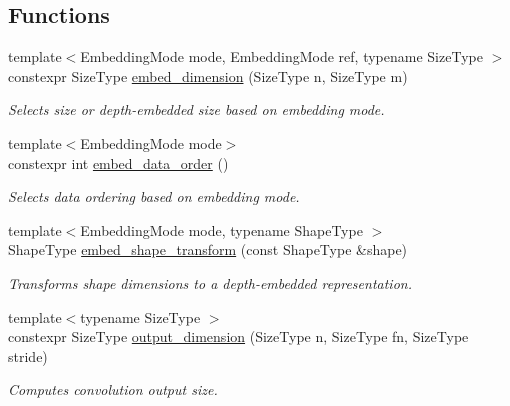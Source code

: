 \subsection*{Functions}
\begin{DoxyCompactItemize}
\item 
{\footnotesize template$<$Embedding\-Mode mode, Embedding\-Mode ref, typename Size\-Type $>$ }\\constexpr Size\-Type \hyperlink{namespaceffnn_1_1layer_1_1convolution_a0cca23056b3d9d79e6604c9419814351}{embed\-\_\-dimension} (Size\-Type n, Size\-Type m)
\begin{DoxyCompactList}\small\item\em Selects size or depth-\/embedded size based on embedding mode. \end{DoxyCompactList}\item 
{\footnotesize template$<$Embedding\-Mode mode$>$ }\\constexpr int \hyperlink{namespaceffnn_1_1layer_1_1convolution_a88d0a4ec4a7dbc89c35ce95d859a78cf}{embed\-\_\-data\-\_\-order} ()
\begin{DoxyCompactList}\small\item\em Selects data ordering based on embedding mode. \end{DoxyCompactList}\item 
{\footnotesize template$<$Embedding\-Mode mode, typename Shape\-Type $>$ }\\Shape\-Type \hyperlink{namespaceffnn_1_1layer_1_1convolution_a773c97d21219b026d77a46ac642ef4e6}{embed\-\_\-shape\-\_\-transform} (const Shape\-Type \&shape)
\begin{DoxyCompactList}\small\item\em Transforms shape dimensions to a depth-\/embedded representation. \end{DoxyCompactList}\item 
{\footnotesize template$<$typename Size\-Type $>$ }\\constexpr Size\-Type \hyperlink{namespaceffnn_1_1layer_1_1convolution_aca263840b789df041d868a8a87dbf36a}{output\-\_\-dimension} (Size\-Type n, Size\-Type fn, Size\-Type stride)
\begin{DoxyCompactList}\small\item\em Computes convolution output size. \end{DoxyCompactList}\end{DoxyCompactItemize}


